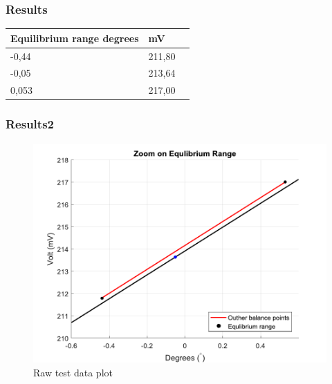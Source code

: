 \subsubsection{Results}
\begin{table}[H]
	\begin{tabular}{|l|l|p{4.3cm}|}
		\hline%
		\textbf{Equilibrium range degrees}       &  \textbf{mV}         \\
		\hline%
		-0,44                               			  & 211,80               \\
		\hline%
		-0,05                                          & 213,64               \\
		\hline%
		0,053 										  & 217,00              \\
		\hline%
	\end{tabular}
\end{table}

\subsubsection{Results2}
\begin{figure}[H] 
	\centering 
	\includegraphics[scale=0.7]{figures/linearityOfPotmeterTest2-2}
	\caption{Raw test data plot}
	\label{linearityOfPotmeterTest2-2}
\end{figure}